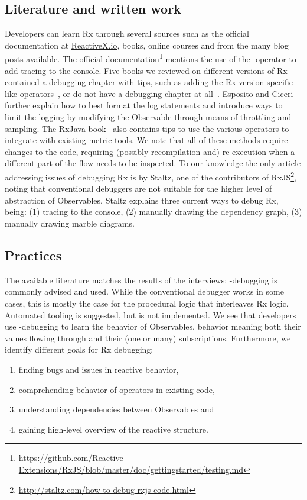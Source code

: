 \subsection{Literature and written work}
Developers can learn Rx through several sources such as the official documentation at \href{http://reactivex.io}{ReactiveX.io}, books, online courses and from the many blog posts available. The official documentation\footnote{
	\url{https://github.com/Reactive-Extensions/RxJS/blob/master/doc/gettingstarted/testing.md}
} mentions the use of the -operator to add tracing to the console. Five books we reviewed on different versions of Rx contained a debugging chapter with tips, such as adding the Rx version specific -like operators~\cite{esposito2016reactive,rxjavabook2016}, or do not have a debugging chapter at all~\cite{introtorx, rxjavabook2015, rxswiftbook2017}. Esposito and Ciceri~\cite{esposito2016reactive} further explain how to best format the log statements and introduce ways to limit the logging by modifying the Observable through means of throttling and sampling. The RxJava book~\cite{rxjavabook2016} also contains tips to use the various  operators to integrate with existing metric tools. We note that all of these methods require changes to the code, requiring (possibly recompilation and) re-execution when a different part of the flow needs to be inspected.
To our knowledge the only article addressing issues of debugging Rx is by Staltz, one of the contributors of RxJS\footnote{\url{http://staltz.com/how-to-debug-rxjs-code.html}}, noting that conventional debuggers are not suitable for the higher level of abstraction of Observables. Staltz explains three current ways to debug Rx, being: (1) tracing to the console, (2) manually drawing the dependency graph, (3) manually drawing marble diagrams.

\subsection{Practices}
The available literature matches the results of the interviews: -debugging is commonly advised and used. While the conventional debugger works in some cases, this is mostly the case for the procedural logic that interleaves Rx logic. Automated tooling is suggested, but is not implemented. We see that developers use -debugging to learn the behavior of Observables, behavior meaning both their values flowing through and their (one or many) subscriptions. Furthermore, we identify different goals for Rx debugging:
\begin{enumerate}
\itemsep0em 
\item[(1)] finding bugs and issues in reactive behavior,
\item[(2)] comprehending behavior of operators in existing code,
\item[(3)] understanding dependencies between Observables and
\item[(4)] gaining high-level overview of the reactive structure.
\end{enumerate}